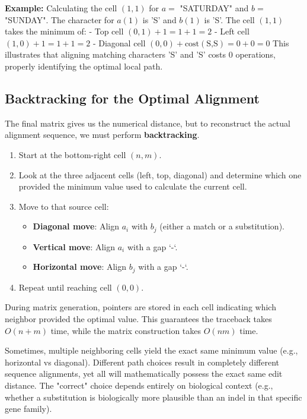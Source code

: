 \textbf{Example:}
Calculating the cell $(1,1)$ for $a=$ "SATURDAY" and $b=$ "SUNDAY". The character for $a(1)$ is 'S' and $b(1)$ is 'S'. 
The cell $(1,1)$ takes the minimum of:
- Top cell $(0,1) + 1 = 1 + 1 = 2$
- Left cell $(1,0) + 1 = 1 + 1 = 2$
- Diagonal cell $(0,0) + \text{cost}(\text{S,S}) = 0 + 0 = 0$
This illustrates that aligning matching characters 'S' and 'S' costs 0 operations, properly identifying the optimal local path.

\subsection{Backtracking for the Optimal Alignment}
The final matrix gives us the numerical distance, but to reconstruct the actual alignment sequence, we must perform \textbf{backtracking}.

\begin{enumerate}
    \item Start at the bottom-right cell $(n,m)$.
    \item Look at the three adjacent cells (left, top, diagonal) and determine which one provided the minimum value used to calculate the current cell.
    \item Move to that source cell:
    \begin{itemize}
        \item \textbf{Diagonal move}: Align $a_i$ with $b_j$ (either a match or a substitution).
        \item \textbf{Vertical move}: Align $a_i$ with a gap `-`.
        \item \textbf{Horizontal move}: Align $b_j$ with a gap `-`.
    \end{itemize}
    \item Repeat until reaching cell $(0,0)$.
\end{enumerate}

\sta During matrix generation, pointers are stored in each cell indicating which neighbor provided the optimal value. This guarantees the traceback takes $O(n+m)$ time, while the matrix construction takes $O(nm)$ time.

Sometimes, multiple neighboring cells yield the exact same minimum value (e.g., horizontal vs diagonal). Different path choices result in completely different sequence alignments, yet all will mathematically possess the exact same edit distance. The "correct" choice depends entirely on biological context (e.g., whether a substitution is biologically more plausible than an indel in that specific gene family).


